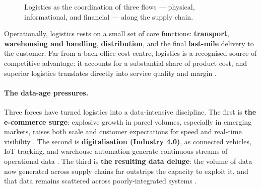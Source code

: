 \begin{figure}[H]
\centering
{}
\caption{Logistics as the coordination of three flows --- physical, informational, and financial ---
along the supply chain.}
\label{fig:ch2-three-flows}
\end{figure}

Operationally, logistics rests on a small set of core functions: \textbf{transport}, \textbf{warehousing
and handling}, \textbf{distribution}, and the final \textbf{last-mile} delivery to the customer. Far
from a back-office cost centre, logistics is a recognised source of competitive advantage: it accounts
for a substantial share of product cost, and superior logistics translates directly into service
quality and margin \parencite{christopher2016}.

\paragraph{The data-age pressures.}
Three forces have turned logistics into a data-intensive discipline. The first is \textbf{the e-commerce
surge}: explosive growth in parcel volumes, especially in emerging markets, raises both scale and
customer expectations for speed and real-time visibility \parencite{unctad2025, statista2025}. The
second is \textbf{digitalisation (Industry 4.0)}, as connected vehicles, IoT tracking, and warehouse
automation generate continuous streams of operational data \parencite{hofmann2017}. The third is
\textbf{the resulting data deluge}: the volume of data now generated across supply chains far outstrips
the capacity to exploit it, and that data remains scattered across poorly-integrated systems
\parencite{kpmg2024, logisticsviewpoints2026}.

